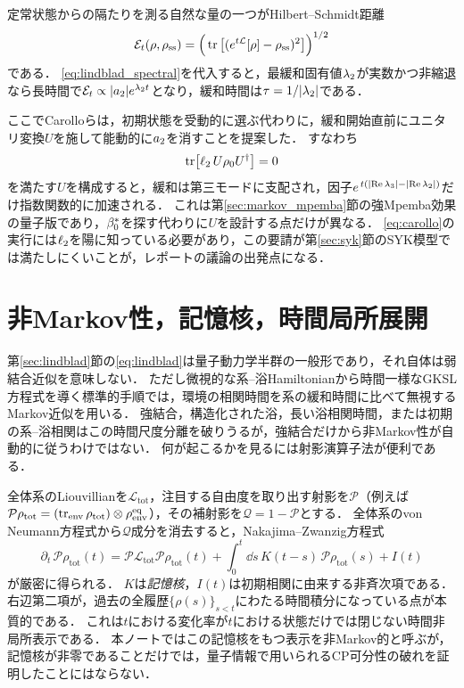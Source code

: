 \documentclass[a4paper,11pt,onecolumn]{jlreq}
\begin{document}
定常状態からの隔たりを測る自然な量の一つがHilbert--Schmidt距離
\begin{equation}
  \mathcal{E}_t(\rho,\rho_{\mathrm{ss}})
  = \Big(\tr\big[(e^{t\mathcal{L}}[\rho]-\rho_{\mathrm{ss}})^2\big]\Big)^{1/2}
  \label{eq:hs_distance}
\end{equation}
である．
\eqref{eq:lindblad_spectral}を代入すると，最緩和固有値$\lambda_{2}$が実数かつ非縮退なら長時間で$\mathcal{E}_t\propto\abs{a_{2}}e^{\lambda_{2} t}$となり，緩和時間は$\tau=1/\abs{\lambda_{2}}$である．

ここでCarolloらは，初期状態を受動的に選ぶ代わりに，緩和開始直前にユニタリ変換$U$を施して能動的に$a_{2}$を消すことを提案した\cite{Carollo2021}．
すなわち
\begin{equation}
  \tr\!\big[\ell_{2}\,U\rho_0 U^{\dagger}\big] = 0
  \label{eq:carollo}
\end{equation}
を満たす$U$を構成すると，緩和は第三モードに支配され，因子$e^{\,t(\abs{\Re\lambda_3}-\abs{\Re\lambda_{2}})}$だけ指数関数的に加速される．
これは第\ref{sec:markov_mpemba}節の強Mpemba効果の量子版であり，$\beta_{0}^{*}$を探す代わりに$U$を設計する点だけが異なる．
\eqref{eq:carollo}の実行には$\ell_{2}$を陽に知っている必要があり，この要請が第\ref{sec:syk}節のSYK模型では満たしにくいことが，レポートの議論の出発点になる．

\section{非Markov性，記憶核，時間局所展開}
\label{sec:nonmarkov}

第\ref{sec:lindblad}節の\eqref{eq:lindblad}は量子動力学半群の一般形であり，それ自体は弱結合近似を意味しない．
ただし微視的な系--浴Hamiltonianから時間一様なGKSL方程式を導く標準的手順では，環境の相関時間を系の緩和時間に比べて無視するMarkov近似を用いる．
強結合，構造化された浴，長い浴相関時間，または初期の系--浴相関はこの時間尺度分離を破りうるが，強結合だけから非Markov性が自動的に従うわけではない．
何が起こるかを見るには射影演算子法が便利である．

全体系のLiouvillianを$\mathcal{L}_{\mathrm{tot}}$，注目する自由度を取り出す射影を$\mathcal{P}$（例えば$\mathcal{P}\rho_{\mathrm{tot}}=(\tr_{\mathrm{env}}\rho_{\mathrm{tot}})\otimes\rho_{\mathrm{env}}^{\mathrm{eq}}$），その補射影を$\mathcal{Q}=1-\mathcal{P}$とする．
全体系のvon Neumann方程式から$\mathcal{Q}$成分を消去すると，Nakajima--Zwanzig方程式
\begin{equation}
  \partial_t\,\mathcal{P}\rho_{\mathrm{tot}}(t)
  = \mathcal{P}\mathcal{L}_{\mathrm{tot}}\mathcal{P}\rho_{\mathrm{tot}}(t)
    + \int_0^{t}\dd{s}\,K(t-s)\,\mathcal{P}\rho_{\mathrm{tot}}(s)
    + I(t)
  \label{eq:nakajima_zwanzig}
\end{equation}
が厳密に得られる\cite{Nakajima1958,Zwanzig1960}．
$K$は\emph{記憶核}，$I(t)$は初期相関に由来する非斉次項である．
右辺第二項が，過去の全履歴$\{\rho(s)\}_{s<t}$にわたる時間積分になっている点が本質的である．
これは$t$における変化率が$t$における状態だけでは閉じない時間非局所表示である．
本ノートではこの記憶核をもつ表示を非Markov的と呼ぶが，記憶核が非零であることだけでは，量子情報で用いられるCP可分性の破れを証明したことにはならない．
\end{document}
